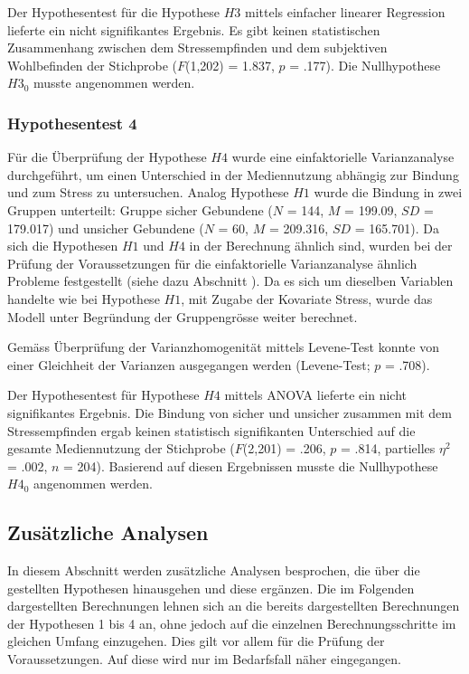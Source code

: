 Der Hypothesentest für die Hypothese $H3$ mittels einfacher linearer Regression lieferte ein nicht signifikantes Ergebnis. Es gibt keinen statistischen Zusammenhang zwischen dem Stressempfinden und dem subjektiven Wohlbefinden der Stichprobe ($F$(1,202) = 1.837, $p$ = .177).  Die Nullhypothese $H3_{0}$ musste angenommen werden.

\subsubsection{Hypothesentest 4}
Für die Überprüfung der Hypothese $H4$ wurde eine einfaktorielle Varianzanalyse durchgeführt, um einen Unterschied in der Mediennutzung abhängig zur Bindung und zum Stress zu untersuchen. Analog Hypothese $H1$ wurde die Bindung in zwei Gruppen unterteilt: Gruppe sicher Gebundene ($N$ = 144, $M$ = 199.09, $SD$ = 179.017) und unsicher Gebundene ($N$ = 60, $M$ = 209.316, $SD$ = 165.701). Da sich die Hypothesen $H1$ und $H4$ in der Berechnung ähnlich sind, wurden bei der Prüfung der Voraussetzungen für die einfaktorielle Varianzanalyse ähnlich Probleme festgestellt (siehe dazu Abschnitt ). Da es sich um dieselben Variablen handelte wie bei Hypothese $H1$, mit Zugabe der Kovariate Stress, wurde das Modell unter Begründung der Gruppengrösse weiter berechnet. 

Gemäss Überprüfung der Varianzhomogenität mittels Levene-Test konnte von einer Gleichheit der Varianzen ausgegangen werden (Levene-Test; $p$ = .708). 
\linebreak

Der Hypothesentest für Hypothese $H4$ mittels ANOVA lieferte ein nicht signifikantes Ergebnis. Die Bindung von sicher und unsicher zusammen mit dem Stressempfinden ergab keinen statistisch signifikanten Unterschied auf die gesamte Mediennutzung der Stichprobe ($F$(2,201) = .206, $p$ = .814, partielles $\eta^2$ = .002, $n$ = 204). Basierend auf diesen Ergebnissen musste die Nullhypothese $H4_{0}$ angenommen werden. 

\subsection{Zusätzliche Analysen} \label{sec:ZusätzlicheAnalysen}
In diesem Abschnitt werden zusätzliche Analysen besprochen, die über die gestellten Hypothesen hinausgehen und diese ergänzen. Die im Folgenden dargestellten Berechnungen lehnen sich an die bereits dargestellten Berechnungen der Hypothesen 1 bis 4 an, ohne jedoch auf die einzelnen Berechnungsschritte im gleichen Umfang einzugehen. Dies gilt vor allem für die Prüfung der Voraussetzungen. Auf diese wird nur im Bedarfsfall näher eingegangen.

